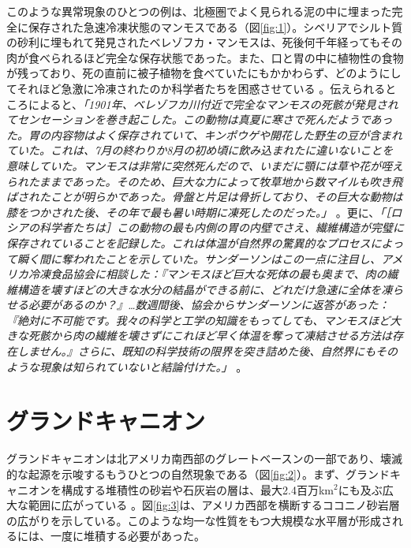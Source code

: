 \documentclass[10pt,twocolumn,letterpaper]{article}
\begin{document}
このような異常現象のひとつの例は、北極圏でよく見られる泥の中に埋まった完全に保存された急速冷凍状態のマンモスである（図\ref{fig:1}）。シベリアでシルト質の砂利に埋もれて発見されたベレゾフカ・マンモスは、死後何千年経ってもその肉が食べられるほど完全な保存状態であった。また、口と胃の中に植物性の食物が残っており、死の直前に被子植物を食べていたにもかかわらず、どのようにしてそれほど急激に冷凍されたのか科学者たちを困惑させている \cite{17}。伝えられるところによると、\textit{「1901年、ベレゾフカ川付近で完全なマンモスの死骸が発見されてセンセーションを巻き起こした。この動物は真夏に寒さで死んだようであった。胃の内容物はよく保存されていて、キンポウゲや開花した野生の豆が含まれていた。これは、7月の終わりか8月の初め頃に飲み込まれたに違いないことを意味していた。マンモスは非常に突然死んだので、いまだに顎には草や花が咥えられたままであった。そのため、巨大な力によって牧草地から数マイルも吹き飛ばされたことが明らかであった。骨盤と片足は骨折しており、その巨大な動物は膝をつかされた後、その年で最も暑い時期に凍死したのだった。」} \cite{18}。更に、\textit{「［ロシアの科学者たちは］この動物の最も内側の胃の内壁でさえ、繊維構造が完璧に保存されていることを記録した。これは体温が自然界の驚異的なプロセスによって瞬く間に奪われたことを示していた。サンダーソンはこの一点に注目し、アメリカ冷凍食品協会に相談した：『マンモスほど巨大な死体の最も奥まで、肉の繊維構造を壊すほどの大きな水分の結晶ができる前に、どれだけ急速に全体を凍らせる必要があるのか？』…数週間後、協会からサンダーソンに返答があった：『絶対に不可能です。我々の科学と工学の知識をもってしても、マンモスほど大きな死骸から肉の繊維を壊さずにこれほど早く体温を奪って凍結させる方法は存在しません。』さらに、既知の科学技術の限界を突き詰めた後、自然界にもそのような現象は知られていないと結論付けた。」} \cite{19}。

\section{グランドキャニオン}

グランドキャニオンは北アメリカ南西部のグレートベースンの一部であり、壊滅的な起源を示唆するもうひとつの自然現象である（図\ref{fig:2}）。まず、グランドキャニオンを構成する堆積性の砂岩や石灰岩の層は、最大2.4百万km$^2$にも及ぶ広大な範囲に広がっている \cite{21}。図\ref{fig:3}は、アメリカ西部を横断するココニノ砂岩層の広がりを示している。このような均一な性質をもつ大規模な水平層が形成されるには、一度に堆積する必要があった。
\end{document}
